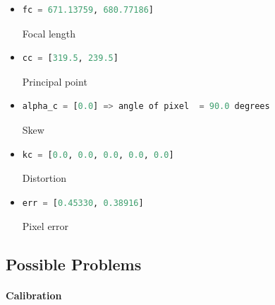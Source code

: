 \documentclass{scrartcl}
\begin{document}
\begin{itemize}
\item
\begin{lstlisting}[language=Python]
fc = 671.13759, 680.77186]
\end{lstlisting}
Focal length

\item
\begin{lstlisting}[language=Python]
cc = [319.5, 239.5]
\end{lstlisting}
Principal point

\item
\begin{lstlisting}[language=Python]
alpha_c = [0.0] => angle of pixel  = 90.0 degrees
\end{lstlisting}
Skew

\item
\begin{lstlisting}[language=Python]
kc = [0.0, 0.0, 0.0, 0.0, 0.0]
\end{lstlisting}
Distortion

\item
\begin{lstlisting}[language=Python]
err = [0.45330, 0.38916]
\end{lstlisting}
Pixel error


\end{itemize}


\subsection{Possible Problems}
\paragraph{Calibration}
\end{document}
